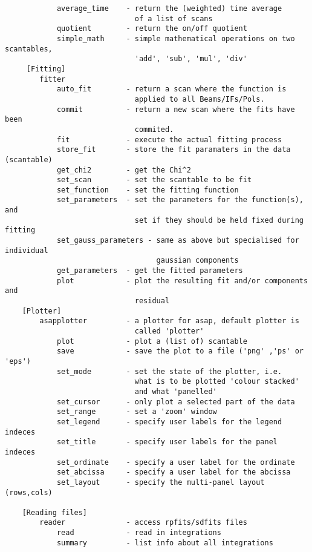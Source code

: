 \documentclass[11pt]{article}
\begin{document}
\begin{verbatim}
            average_time    - return the (weighted) time average 
                              of a list of scans
            quotient        - return the on/off quotient
            simple_math     - simple mathematical operations on two scantables,
                              'add', 'sub', 'mul', 'div'
     [Fitting]
        fitter
            auto_fit        - return a scan where the function is
                              applied to all Beams/IFs/Pols.
            commit          - return a new scan where the fits have been
                              commited.
            fit             - execute the actual fitting process
            store_fit       - store the fit paramaters in the data (scantable)
            get_chi2        - get the Chi^2
            set_scan        - set the scantable to be fit
            set_function    - set the fitting function
            set_parameters  - set the parameters for the function(s), and
                              set if they should be held fixed during fitting
            set_gauss_parameters - same as above but specialised for individual
                                   gaussian components
            get_parameters  - get the fitted parameters
            plot            - plot the resulting fit and/or components and
                              residual
    [Plotter]
        asapplotter         - a plotter for asap, default plotter is
                              called 'plotter'
            plot            - plot a (list of) scantable
            save            - save the plot to a file ('png' ,'ps' or 'eps')
            set_mode        - set the state of the plotter, i.e.
                              what is to be plotted 'colour stacked'
                              and what 'panelled'
            set_cursor      - only plot a selected part of the data
            set_range       - set a 'zoom' window
            set_legend      - specify user labels for the legend indeces
            set_title       - specify user labels for the panel indeces
            set_ordinate    - specify a user label for the ordinate
            set_abcissa     - specify a user label for the abcissa
            set_layout      - specify the multi-panel layout (rows,cols)
            
    [Reading files]
        reader              - access rpfits/sdfits files
            read            - read in integrations
            summary         - list info about all integrations


\end{verbatim}
\end{document}
